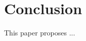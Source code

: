 \documentclass[conference]{IEEEtran}
\begin{document}
	
	
	\section{Conclusion} \label{sec:conclusion}
	This paper proposes ...
	
 
	    
	
	
	
	
	
	
	
		
		
\end{document}
